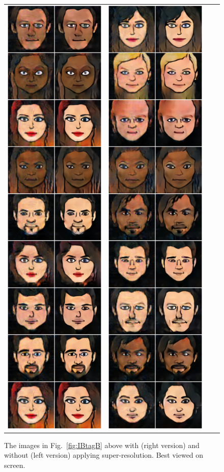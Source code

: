 \documentclass{article} %
\begin{document}
\begin{figure}[H]
\begin{tabular}{cccc}
\includegraphics[trim=0 0 0 0, clip, width=0.230235\linewidth]{super_res_part3.png}&
\includegraphics[trim=0 0 0 0, clip, width=0.230235\linewidth]{super_res_part4.png}
\end{tabular}
\caption{\label{fig:superres} The images in Fig.~\ref{fig:IBtagB} above with (right version) and without (left version) applying super-resolution. Best viewed on screen.}
\end{figure}
\end{document}
